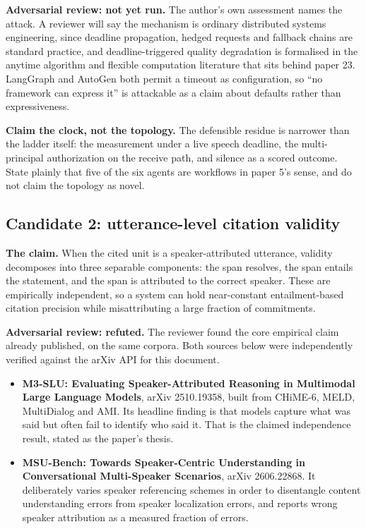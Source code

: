 \textbf{Adversarial review: not yet run.} The author's own assessment names the
attack. A reviewer will say the mechanism is ordinary distributed systems
engineering, since deadline propagation, hedged requests and fallback chains
are standard practice, and deadline-triggered quality degradation is formalised
in the anytime algorithm and flexible computation literature that sits behind
paper 23. LangGraph and AutoGen both permit a timeout as configuration, so
``no framework can express it'' is attackable as a claim about defaults rather
than expressiveness.

\begin{takeaway}
\textbf{Claim the clock, not the topology.} The defensible residue is narrower
than the ladder itself: the measurement under a live speech deadline, the
multi-principal authorization on the receive path, and silence as a scored
outcome. State plainly that five of the six agents are workflows in paper 5's
sense, and do not claim the topology as novel.
\end{takeaway}

\subsection{Candidate 2: utterance-level citation validity}

\textbf{The claim.} When the cited unit is a speaker-attributed utterance,
validity decomposes into three separable components: the span resolves, the
span entails the statement, and the span is attributed to the correct speaker.
These are empirically independent, so a system can hold near-constant
entailment-based citation precision while misattributing a large fraction of
commitments.

\textbf{Adversarial review: refuted.} The reviewer found the core empirical
claim already published, on the same corpora. Both sources below were
independently verified against the arXiv API for this document.

\begin{itemize}
\item \textbf{M3-SLU: Evaluating Speaker-Attributed Reasoning in Multimodal
Large Language Models}, arXiv 2510.19358, built from CHiME-6, MELD,
MultiDialog and AMI. Its headline finding is that models capture what was said
but often fail to identify who said it. That is the claimed independence
result, stated as the paper's thesis.
\item \textbf{MSU-Bench: Towards Speaker-Centric Understanding in
Conversational Multi-Speaker Scenarios}, arXiv 2606.22868. It deliberately
varies speaker referencing schemes in order to disentangle content
understanding errors from speaker localization errors, and reports wrong
speaker attribution as a measured fraction of errors.
\end{itemize}

